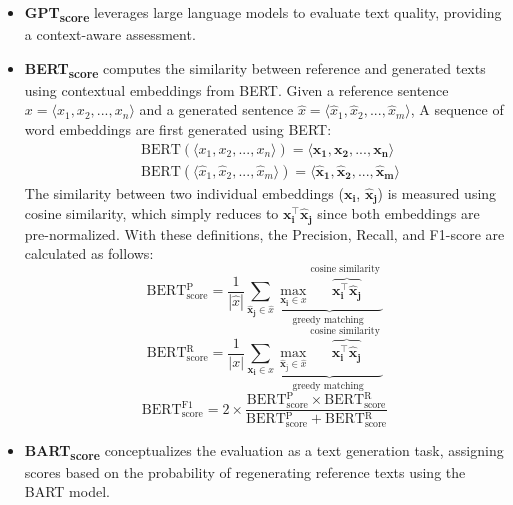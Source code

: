 \begin{itemize}[leftmargin=*]
    \item \textbf{GPT\textsubscript{score}} \cite{wang2023chatgpt} leverages large language models to evaluate text quality, providing a context-aware assessment.
    
    \item \textbf{BERT\textsubscript{score}} \cite{zhang2019bertscore} computes the similarity between reference and generated texts using contextual embeddings from BERT. Given a reference sentence $x = \langle x_1, x_2, ..., x_n \rangle$ and a generated sentence $\hat{x} = \langle\hat{x}_1, \hat{x}_2, ..., \hat{x}_m\rangle$, A sequence of word embeddings are first generated using BERT:
    \begin{equation}
    \begin{split}
        & \text{BERT}(\langle x_1, x_2, ..., x_n \rangle) = \langle \mathbf{x_1}, \mathbf{x_2}, ..., \mathbf{x_n} \rangle \\
        & \text{BERT}(\langle \hat{x}_1, \hat{x}_2, ..., \hat{x}_m \rangle) = \langle \mathbf{\hat{x}_1}, \mathbf{\hat{x}_2}, ..., \mathbf{\hat{x}_m} \rangle
    \end{split}
    \end{equation}
    The similarity between two individual embeddings ($\mathbf{x_i}$, $\mathbf{\hat{x}_j}$) is measured using cosine similarity, which simply reduces to $\mathbf{x}_{\mathbf{i}}^{\top}\hat{\mathbf{x}}_{\mathbf{j}}$ since both embeddings are pre-normalized. With these definitions, the Precision, Recall, and F1-score are calculated as follows:
    \begin{equation}
    \text{BERT}{_\text{score}^\text{P}}=\frac{1}{|\hat{x}|} \sum_{\hat{\mathbf{x}}_{\mathbf{j}} \in \hat{x}} \underbrace{\max _{\mathbf{x}_{\mathbf{i}} \in x} \overbrace{\mathbf{x}_{\mathbf{i}}^{\top} \hat{\mathbf{x}}_{\mathbf{j}}}^{\text {cosine similarity }}}_{\text {greedy matching }}
    \end{equation}
    \begin{equation}
    \text{BERT}{_\text{score}^\text{R}}=\frac{1}{|x|} \sum_{\mathbf{x}_{\mathbf{i}} \in x} \underbrace{\max _{\hat{\mathbf{x}}_{\mathrm{j}} \in \hat{x}} \overbrace{\mathbf{x}_{\mathbf{i}}^{\top} \hat{\mathbf{x}}_{\mathbf{j}}}^{\text {cosine similarity }}}_{\text {greedy matching }}
    \end{equation}
    \begin{equation}
    \text{BERT}{_\text{score}^\text{F1}} = 2 \times \frac{\text{BERT}{_\text{score}^\text{P}} \times \text{BERT}{_\text{score}^\text{R}}}{\text{BERT}{_\text{score}^\text{P}} + \text{BERT}{_\text{score}^\text{R}}}
    \end{equation}
    \item \textbf{BART\textsubscript{score}} \cite{yuan2021bartscore} conceptualizes the evaluation as a text generation task, assigning scores based on the probability of regenerating reference texts using the BART model.


\end{itemize}
